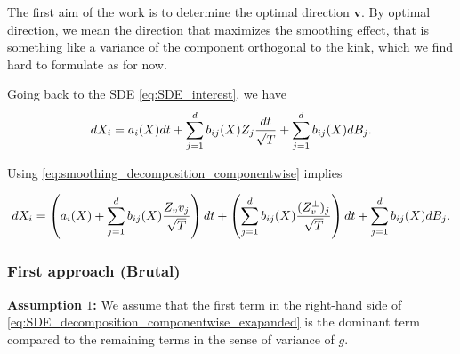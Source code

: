 The first aim of the work is to determine the optimal direction $\mathbf{v}$. By optimal direction, we mean the direction that maximizes the smoothing effect, that is something like a variance of the component orthogonal to the kink, which we find hard to formulate as for now.




Going back to the SDE \eqref{eq:SDE_interest}, we have 
\begin{equation}
dX_i=a_i(X) dt +\sum_{j=1}^d b_{ij}(X) Z_j \frac{dt}{\sqrt{T}}+\sum_{j=1}^d b_{ij}(X) dB_j .
\end{equation}

Using \eqref{eq:smoothing_decomposition_componentwise} implies

\begin{equation}\label{eq:SDE_decomposition_componentwise_exapanded}
dX_i=\left(a_i(X)+\sum_{j=1}^d b_{ij}(X)  \frac{Z_v v_j}{\sqrt{T}}\right) dt+\left(\sum_{j=1}^d b_{ij}(X) \frac{(Z_v^\perp)_j}{\sqrt{T}}\right) dt +\sum_{j=1}^d b_{ij}(X) dB_j .
\end{equation}

\subsubsection{First approach (Brutal)}

\textbf{Assumption $1$:} We assume that the first term in the right-hand side of \eqref{eq:SDE_decomposition_componentwise_exapanded}  is the dominant term compared to the remaining terms in the sense of variance of $g$.



